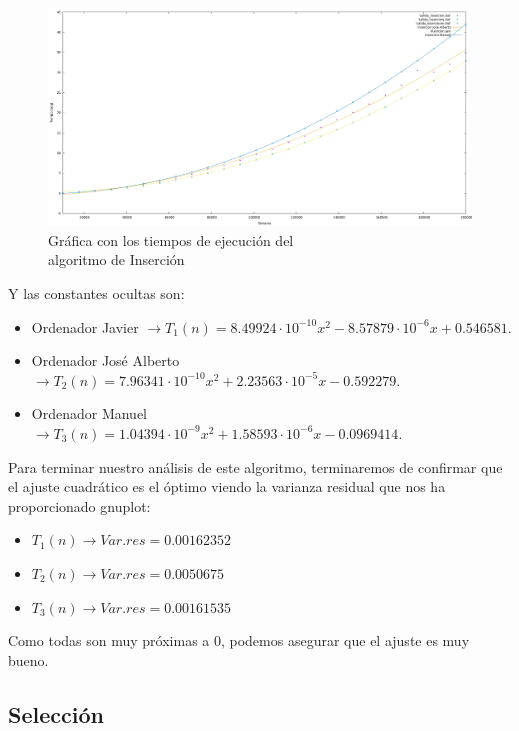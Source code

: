 \documentclass[10pt,a4paper]{article}
\begin{document}
\begin{figure}[h!]
	\centering
	\includegraphics[scale=0.16]{../../Images/Insercion_combinados.png}
	\caption{Gráfica con los tiempos de ejecución del \\algoritmo de Inserción}
\end{figure}

Y las constantes ocultas son:

\begin{itemize}
	\item Ordenador Javier \(\rightarrow T_1(n) = 8.49924 \cdot 10^{-10} x^2 - 8.57879 \cdot 10^{-6} x + 0.546581\).
	\item Ordenador José Alberto \(\rightarrow T_2(n) = 7.96341 \cdot 10^{-10} x^2 + 2.23563 \cdot 10^{-5} x - 0.592279\).
	\item Ordenador Manuel \(\rightarrow T_3(n) = 1.04394 \cdot 10^{-9} x^2 + 1.58593 \cdot 10^{-6} x - 0.0969414\).
\end{itemize}

Para terminar nuestro análisis de este algoritmo, terminaremos de confirmar que el ajuste cuadrático es el óptimo viendo la varianza residual que nos ha proporcionado gnuplot:

\begin{itemize}
	\item \(T_1(n) \longrightarrow Var.res = 0.00162352\)
	\item \(T_2(n) \longrightarrow Var.res = 0.0050675\)
	\item \(T_3(n) \longrightarrow Var.res = 0.00161535\)
\end{itemize}

Como todas son muy próximas a 0, podemos asegurar que el ajuste es muy bueno.

\subsection{Selección}

\end{document}
